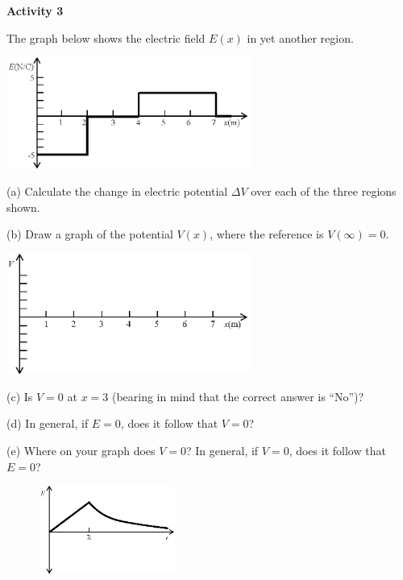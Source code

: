 \answerspace{1.1in}

\pagebreak[2]
\textbf{Activity 3} 

The graph below shows the electric field $E(x)$ in yet another region.
\begin{center}
\includegraphics[width=0.6\textwidth]{finding_v_from_e/fig5.eps}
\end{center}

(a) Calculate the change in electric potential $\Delta V$ over each of the three regions shown.
\vspace{1.2in}

(b) Draw a graph of the potential $V(x)$, where the reference is $V(\infty)=0$.
\begin{center}
\includegraphics[width=0.6\textwidth]{finding_v_from_e/fig6.eps}
\end{center}

(c) Is $V=0$ at $x=3$ (bearing in mind that the correct answer is ``No'')?
\vspace{0.6in}

(d) In general, if $E=0$, does it follow that $V=0$?
\vspace{0.6in}

(e) Where on your graph does $V=0$?  In general, if $V=0$, does it follow that $E=0$?
\vspace{0.6in}

\pagebreak[2]
\begin{figure}
\vspace{0.2 in}
    \includegraphics[width=0.4\textwidth]{finding_v_from_e/fig7.eps}
\end{figure}

